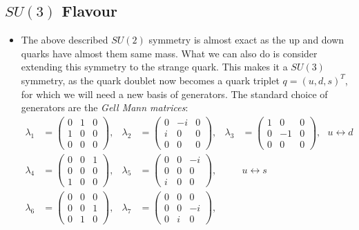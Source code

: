 \documentclass[11pt]{article}
\numberwithin{equation}{section}
\begin{document}
\subsection{$SU(3)$ Flavour} %
\label{sub:su3}
\begin{itemize}
    \item The above described $SU(2)$ symmetry is almost exact as the up and down quarks have almost them same mass. What we can also do is consider extending this symmetry to the strange quark. This makes it a $SU(3)$ symmetry, as the quark doublet now becomes a quark triplet $q= (u,d,s)^T$, for which we will need a new basis of generators. The standard choice of generators are the \emph{Gell Mann matrices}:
\begin{align*}
    \lambda_1 &= \begin{pmatrix} 0 & 1 & 0 \\ 1 & 0 & 0 \\ 0 & 0 & 0 \end{pmatrix}, &
    \lambda_2 &= \begin{pmatrix} 0 & -i & 0 \\ i & 0 & 0 \\ 0 & 0 & 0 \end{pmatrix}, &
    \lambda_3 &= \begin{pmatrix} 1 & 0 & 0 \\ 0 & -1 & 0 \\ 0 & 0 & 0 \end{pmatrix},~~~ u \leftrightarrow d \\[10pt]
    \lambda_4 &= \begin{pmatrix} 0 & 0 & 1 \\ 0 & 0 & 0 \\ 1 & 0 & 0 \end{pmatrix}, &
    \lambda_5 &= \begin{pmatrix} 0 & 0 & -i \\ 0 & 0 & 0 \\ i & 0 & 0 \end{pmatrix}, &
    & u \leftrightarrow s \\[10pt]
    \lambda_6 &= \begin{pmatrix} 0 & 0 & 0 \\ 0 & 0 & 1 \\ 0 & 1 & 0 \end{pmatrix}, &
    \lambda_7 &= \begin{pmatrix} 0 & 0 & 0 \\ 0 & 0 & -i \\ 0 & i & 0 \end{pmatrix}, &

\end{align*}
\end{itemize}
\end{document}
